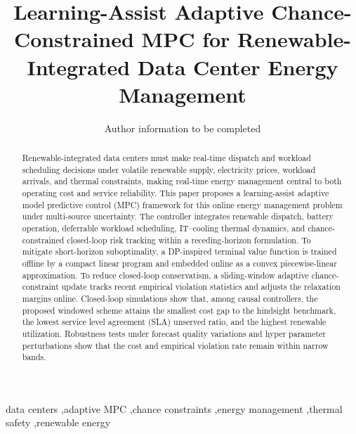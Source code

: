 \documentclass[a4paper,fleqn]{cas-dc}
\theoremstyle{plain}
\theoremstyle{remark}
\theoremstyle{plain}
\begin{document}
\title[mode=title]{Learning-Assist Adaptive Chance-Constrained MPC for Renewable-Integrated Data Center Energy Management}

\author[1]{Author information to be completed}

\begin{abstract}
Renewable-integrated data centers must make real-time dispatch and workload scheduling decisions under volatile renewable supply, electricity prices, workload arrivals, and thermal constraints, making real-time energy management central to both operating cost and service reliability. This paper proposes a learning-assist adaptive model predictive control (MPC) framework for this online energy management problem under multi-source uncertainty. The controller integrates renewable dispatch, battery operation, deferrable workload scheduling, IT--cooling thermal dynamics, and chance-constrained closed-loop risk tracking within a receding-horizon formulation. To mitigate short-horizon suboptimality, a DP-inspired terminal value function is trained offline by a compact linear program and embedded online as a convex piecewise-linear approximation. To reduce closed-loop conservatism, a sliding-window adaptive chance-constraint update tracks recent empirical violation statistics and adjusts the relaxation margins online. Closed-loop simulations show that, among causal controllers, the proposed windowed scheme attains the smallest cost gap to the hindsight benchmark, the lowest service level agreement (SLA) unserved ratio, and the highest renewable utilization. Robustness tests under forecast quality variations and hyper parameter perturbations show that the cost and empirical violation rate remain within narrow bands.
\end{abstract}

\begin{keywords}
data centers \sep adaptive MPC \sep chance constraints \sep energy management \sep thermal safety \sep renewable energy
\end{keywords}
\maketitle
\linenumbers
\end{document}
